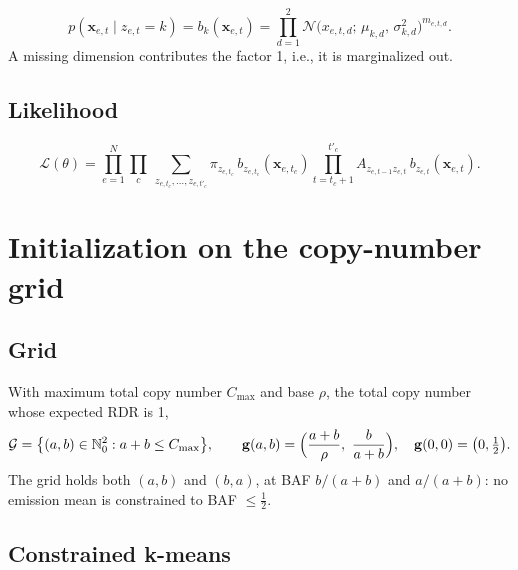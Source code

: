 \documentclass[11pt]{article}
\newcommand{\Norm}{\mathcal{N}}
\newcommand{\x}{\mathbf{x}}
\begin{document}
\begin{equation}
p(\x_{e,t} \mid z_{e,t} = k) = b_k(\x_{e,t})
= \prod_{d=1}^{2} \Norm\bigl(x_{e,t,d};\, \mu_{k,d},\, \sigma^2_{k,d}\bigr)^{m_{e,t,d}} .
\label{eq:emission}
\end{equation}
A missing dimension contributes the factor 1, i.e., it is marginalized out.

\subsection{Likelihood}\label{sec:likelihood}

\begin{equation}
\mathcal{L}(\theta) = \prod_{e=1}^{N}\prod_{c}\ \sum_{z_{e,t_c},\dots,z_{e,t'_c}}
\pi_{z_{e,t_c}}\, b_{z_{e,t_c}}(\x_{e,t_c})
\prod_{t=t_c+1}^{t'_c} A_{z_{e,t-1} z_{e,t}}\, b_{z_{e,t}}(\x_{e,t}) .
\label{eq:likelihood}
\end{equation}

\section{Initialization on the copy-number grid}\label{sec:init}

\subsection{Grid}\label{sec:grid}

With maximum total copy number $C_{\max}$ and base $\rho$, the total copy number whose expected
RDR is 1,
\begin{equation}
\mathcal{G} = \bigl\{(a,b) \in \mathbb{N}_0^2 : a+b \le C_{\max}\bigr\},
\qquad
\mathbf{g}(a,b) = \Bigl(\frac{a+b}{\rho},\ \frac{b}{a+b}\Bigr), \quad
\mathbf{g}(0,0) = \bigl(0, \tfrac12\bigr).
\label{eq:grid}
\end{equation}
The grid holds both $(a, b)$ and $(b, a)$, at BAF $b/(a+b)$ and $a/(a+b)$: no emission mean is
constrained to BAF $\le \tfrac12$.

\subsection{Constrained k-means}\label{sec:kmeans}
\end{document}
